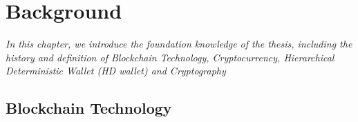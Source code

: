 \setlength{\abovedisplayskip}{0pt}
\setlength{\belowdisplayskip}{0pt}
\setlength{\abovedisplayshortskip}{0pt}
\setlength{\belowdisplayshortskip}{0pt}

\chapter{Background}
\label{chap:background}
\textit{In this chapter, we introduce the foundation knowledge of the thesis, including the history and definition of Blockchain Technology, Cryptocurrency,
  Hierarchical Deterministic Wallet (HD wallet) and Cryptography}

\minitoc

\section{Blockchain Technology}



